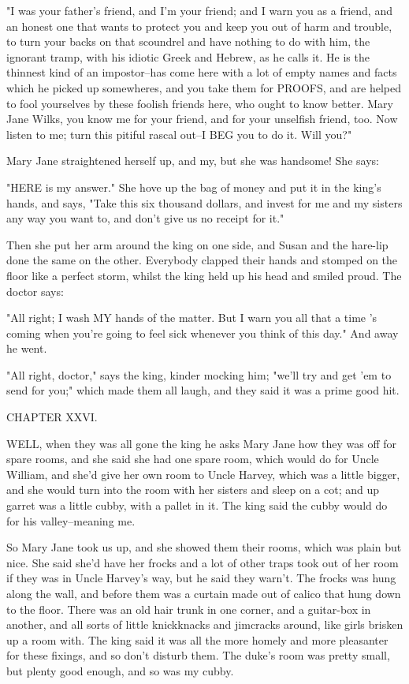 "I was your father's friend, and I'm your friend; and I warn you as a
friend, and an honest one that wants to protect you and keep you out of
harm and trouble, to turn your backs on that scoundrel and have nothing
to do with him, the ignorant tramp, with his idiotic Greek and Hebrew, as
he calls it.  He is the thinnest kind of an impostor--has come here with
a lot of empty names and facts which he picked up somewheres, and you
take them for PROOFS, and are helped to fool yourselves by these foolish
friends here, who ought to know better.  Mary Jane Wilks, you know me for
your friend, and for your unselfish friend, too.  Now listen to me; turn
this pitiful rascal out--I BEG you to do it.  Will you?"

Mary Jane straightened herself up, and my, but she was handsome!  She
says:

"HERE is my answer."  She hove up the bag of money and put it in the
king's hands, and says, "Take this six thousand dollars, and invest for
me and my sisters any way you want to, and don't give us no receipt for
it."

Then she put her arm around the king on one side, and Susan and the
hare-lip done the same on the other.  Everybody clapped their hands and
stomped on the floor like a perfect storm, whilst the king held up his
head and smiled proud.  The doctor says:

"All right; I wash MY hands of the matter.  But I warn you all that a
time 's coming when you're going to feel sick whenever you think of this
day." And away he went.

"All right, doctor," says the king, kinder mocking him; "we'll try and
get 'em to send for you;" which made them all laugh, and they said it was
a prime good hit.




CHAPTER XXVI.

WELL, when they was all gone the king he asks Mary Jane how they was off
for spare rooms, and she said she had one spare room, which would do for
Uncle William, and she'd give her own room to Uncle Harvey, which was a
little bigger, and she would turn into the room with her sisters and
sleep on a cot; and up garret was a little cubby, with a pallet in it.
The king said the cubby would do for his valley--meaning me.

So Mary Jane took us up, and she showed them their rooms, which was plain
but nice.  She said she'd have her frocks and a lot of other traps took
out of her room if they was in Uncle Harvey's way, but he said they
warn't.  The frocks was hung along the wall, and before them was a
curtain made out of calico that hung down to the floor.  There was an old
hair trunk in one corner, and a guitar-box in another, and all sorts of
little knickknacks and jimcracks around, like girls brisken up a room
with.  The king said it was all the more homely and more pleasanter for
these fixings, and so don't disturb them.  The duke's room was pretty
small, but plenty good enough, and so was my cubby.

